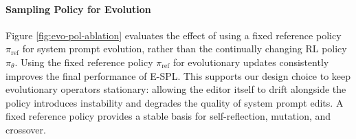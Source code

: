 \documentclass{article}
\theoremstyle{plain}
\theoremstyle{definition}
\theoremstyle{remark}
\begin{document}
\paragraph{Sampling Policy for Evolution}
Figure \ref{fig:evo-pol-ablation} evaluates the effect of using a fixed reference policy $\pi_{\text{ref}}$ for system prompt evolution, rather than the continually changing RL policy $\pi_{\theta}$. Using the fixed reference policy $\pi_{\text{ref}}$ for evolutionary updates consistently improves the final performance of E-SPL. This supports our design choice to keep evolutionary operators stationary: allowing the editor itself to drift alongside the policy introduces instability and degrades the quality of system prompt edits. A fixed reference policy provides a stable basis for self-reflection, mutation, and crossover.
\end{document}
